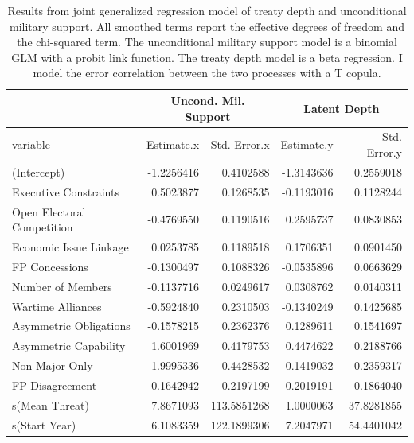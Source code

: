 \documentclass[12pt]{article}
\begin{document}
\begin{table}[ht]
\centering
\begin{tabular}{lrrrr}
  & \multicolumn{2}{c}{Uncond. Mil. Support} & \multicolumn{2}{c}{Latent Depth}\\ \hline
variable & Estimate.x & Std. Error.x & Estimate.y & Std. Error.y \\ 
  \hline
(Intercept) & -1.2256416 & 0.4102588 & -1.3143636 & 0.2559018 \\ 
  Executive Constraints & 0.5023877 & 0.1268535 & -0.1193016 & 0.1128244 \\ 
  Open Electoral Competition & -0.4769550 & 0.1190516 & 0.2595737 & 0.0830853 \\ 
  Economic Issue Linkage & 0.0253785 & 0.1189518 & 0.1706351 & 0.0901450 \\ 
  FP Concessions & -0.1300497 & 0.1088326 & -0.0535896 & 0.0663629 \\ 
  Number of Members & -0.1137716 & 0.0249617 & 0.0308762 & 0.0140311 \\ 
  Wartime Alliances & -0.5924840 & 0.2310503 & -0.1340249 & 0.1425685 \\ 
  Asymmetric Obligations & -0.1578215 & 0.2362376 & 0.1289611 & 0.1541697 \\ 
  Asymmetric Capability & 1.6001969 & 0.4179753 & 0.4474622 & 0.2188766 \\ 
  Non-Major Only & 1.9995336 & 0.4428532 & 0.1419032 & 0.2359317 \\ 
  FP Disagreement & 0.1642942 & 0.2197199 & 0.2019191 & 0.1864040 \\ 
  s(Mean Threat) & 7.8671093 & 113.5851268 & 1.0000063 & 37.8281855 \\ 
  s(Start Year) & 6.1083359 & 122.1899306 & 7.2047971 & 54.4401042 \\ 
   \hline
\end{tabular}
\caption{Results from joint generalized regression model of treaty depth and unconditional military support. 
                     All smoothed terms report the effective degrees of freedom and the chi-squared term. 
                     The unconditional military support model is a binomial GLM with a probit link function. 
                     The treaty depth model is a beta regression. 
                     I model the error correlation between the two processes with a T copula.} 
\label{tab:gjrm-res}
\end{table}
\end{document}
